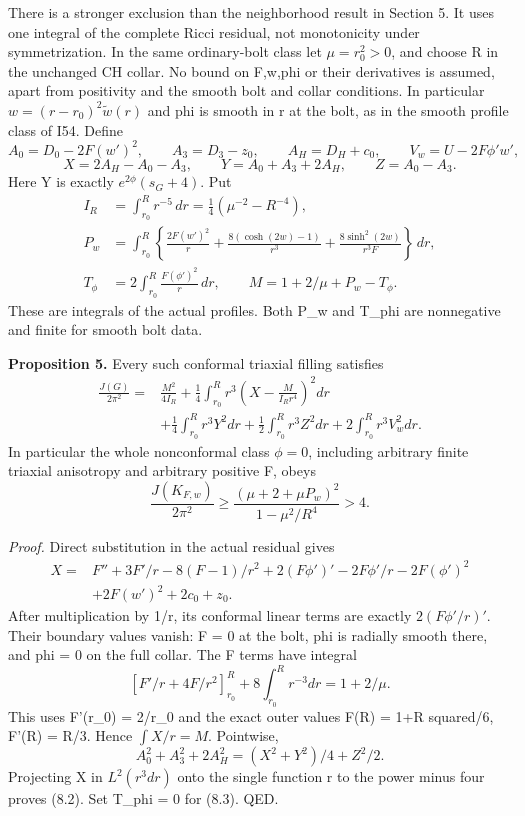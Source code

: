 \documentclass[
  10pt,
]{article}
\begin{document}
There is a stronger exclusion than the neighborhood result in Section 5.
It uses one integral of the complete Ricci residual, not monotonicity
under symmetrization. In the same ordinary-bolt class let
\(\mu=r_0^2>0\), and choose R in the unchanged CH collar. No bound on
F,w,phi or their derivatives is assumed, apart from positivity and the
smooth bolt and collar conditions. In particular
\(w=(r-r_0)^2\widetilde w(r)\) and phi is smooth in r at the bolt, as in
the smooth profile class of I54. Define \[
 A_0=D_0-2F(w')^2,\qquad A_3=D_3-z_0,\qquad A_H=D_H+c_0,
 \qquad V_w=U-2F\phi'w',
\] \[
 X=2A_H-A_0-A_3,\qquad Y=A_0+A_3+2A_H,
 \qquad Z=A_0-A_3.
\] Here Y is exactly \(e^{2\phi}(s_G+4)\). Put \[
\begin{aligned}
 I_R&=\int_{r_0}^Rr^{-5}\,dr
                  =\tfrac14(\mu^{-2}-R^{-4}),\\
 P_w&=\int_{r_0}^R\left\{
    \frac{2F(w')^2}{r}+\frac{8(\cosh(2w)-1)}{r^3}
                 +\frac{8\sinh^2(2w)}{r^3F}\right\}\,dr,\\
 T_\phi&=2\int_{r_0}^R\frac{F(\phi')^2}{r}\,dr,
 \qquad M=1+2/\mu+P_w-T_\phi .
\end{aligned}                                                     \tag{8.1}
\] These are integrals of the actual profiles. Both P\_w and T\_phi are
nonnegative and finite for smooth bolt data.

\textbf{Proposition 5.} Every such conformal triaxial filling satisfies
\[
\boxed{\begin{aligned}
 \frac{J(G)}{2\pi^2}={}&\frac{M^2}{4I_R}
 +\frac14\int_{r_0}^R r^3
                    \left(X-\frac{M}{I_Rr^4}\right)^2dr\\
 &+\frac14\int_{r_0}^Rr^3Y^2dr
  +\frac12\int_{r_0}^Rr^3Z^2dr
  +2\int_{r_0}^Rr^3V_w^2dr .
\end{aligned}}                                                    \tag{8.2}
\] In particular the whole nonconformal class \(\phi=0\), including
arbitrary finite triaxial anisotropy and arbitrary positive F, obeys \[
 \boxed{\frac{J(K_{F,w})}{2\pi^2}
 \ge\frac{(\mu+2+\mu P_w)^2}{1-\mu^2/R^4}>4.}           \tag{8.3}
\]

\emph{Proof.} Direct substitution in the actual residual gives \[
\begin{aligned}
 X={}&F''+3F'/r-8(F-1)/r^2
       +2(F\phi')'-2F\phi'/r-2F(\phi')^2\\
    &+2F(w')^2+2c_0+z_0 .
\end{aligned}
\] After multiplication by 1/r, its conformal linear terms are exactly
\(2(F\phi'/r)'\). Their boundary values vanish: F = 0 at the bolt, phi
is radially smooth there, and phi = 0 on the full collar. The F terms
have integral \[
 \left[F'/r+4F/r^2\right]_{r_0}^R
                    +8\int_{r_0}^Rr^{-3}dr=1+2/\mu.
\] This uses F'(r\_0) = 2/r\_0 and the exact outer values F(R) = 1+R
squared/6, F'(R) = R/3. Hence \(\int X/r=M\). Pointwise, \[
 A_0^2+A_3^2+2A_H^2=(X^2+Y^2)/4+Z^2/2.
\] Projecting X in \(L^2(r^3dr)\) onto the single function r to the
power minus four proves (8.2). Set T\_phi = 0 for (8.3). QED.
\end{document}
